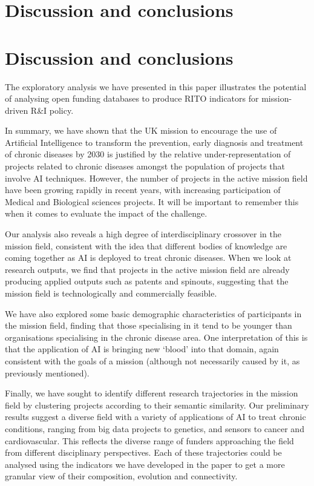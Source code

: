 \documentclass[11pt]{article}
\begin{document}
\section{Discussion and conclusions}
\label{sec:conclusion}

\section{Discussion and conclusions}
The exploratory analysis we have presented in this paper illustrates the potential of analysing open funding databases to produce RITO indicators for mission-driven R&I policy.

In summary, we have shown that the UK mission to encourage the use of Artificial Intelligence to transform the prevention, early diagnosis and treatment of chronic diseases by 2030 is justified by the relative under-representation of projects related to chronic diseases amongst the population of projects that involve AI techniques. However, the number of
projects in the active mission field have been growing rapidly in recent years, with increasing participation of Medical and Biological sciences projects. It will be important to remember this when it comes to evaluate the impact of the challenge.

Our analysis also reveals a high degree of interdisciplinary crossover in the mission field, consistent with the idea that different bodies of knowledge are coming together as AI is deployed to treat chronic diseases. When we look at research outputs, we find that projects in the active mission field are already producing applied outputs such as patents and spinouts, suggesting that the mission field is technologically and commercially feasible.

We have also explored some basic demographic characteristics of participants in the mission field, finding that those specialising in it tend to be younger than organisations specialising in the chronic disease area. One interpretation of this is that the application of AI is bringing new ‘blood’ into that domain, again consistent with the goals of a mission (although not
necessarily caused by it, as previously mentioned).

Finally, we have sought to identify different research trajectories in the mission field by clustering projects according to their semantic similarity. Our preliminary results suggest a diverse field with a variety of applications of AI to treat chronic conditions, ranging from big data projects to genetics, and sensors to cancer and cardiovascular. This reflects the diverse range of funders approaching the field from different disciplinary perspectives. Each of these trajectories could be analysed using the indicators we have developed in the paper to get a more granular view of their composition, evolution and connectivity. 
\end{document}
